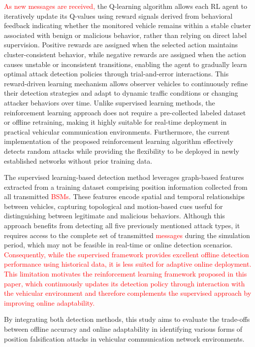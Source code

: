\documentclass[conference]{IEEEtran}
\begin{document}
\textcolor{red}{As new messages are received,} the Q-learning algorithm allows each RL agent to iteratively update its Q-values using reward signals derived from behavioral feedback indicating whether the monitored vehicle remains within a stable cluster associated with benign or malicious behavior, rather than relying on direct label supervision. Positive rewards are assigned when the selected action maintains cluster-consistent behavior, while negative rewards are assigned when the action causes unstable or inconsistent transitions, enabling the agent to gradually learn optimal attack detection policies through trial-and-error interactions. This reward-driven learning mechanism allows observer vehicles to continuously refine their detection strategies and adapt to dynamic traffic conditions or changing attacker behaviors over time. Unlike supervised learning methods, the reinforcement learning approach does not require a pre-collected labeled dataset or offline retraining, making it highly suitable for real-time deployment in practical vehicular communication environments. Furthermore, the current implementation of the proposed reinforcement learning algorithm effectively detects random attacks while providing the flexibility to be deployed in newly established networks without prior training data.


The supervised learning-based detection method \cite{Chamath1} leverages graph-based features extracted from a training dataset comprising position information collected from all transmitted \textcolor{red}{BSMs}. These features encode spatial and temporal relationships between vehicles, capturing topological and motion-based cues useful for distinguishing between legitimate and malicious behaviors. Although this approach benefits from detecting all five previously mentioned attack types, it requires access to the complete set of transmitted \textcolor{red}{messages} during the simulation period, which may not be feasible in real-time or online detection scenarios. \textcolor{red}{Consequently, while the supervised framework provides excellent offline detection performance using historical data, it is less suited for adaptive online deployment. This limitation motivates the reinforcement learning framework proposed in this paper, which continuously updates its detection policy through interaction with the vehicular environment and therefore complements the supervised approach by improving online adaptability.}

By integrating both detection methods, this study aims to evaluate the trade-offs between offline accuracy and online adaptability in identifying various forms of position falsification attacks in vehicular communication network environments.
\end{document}
